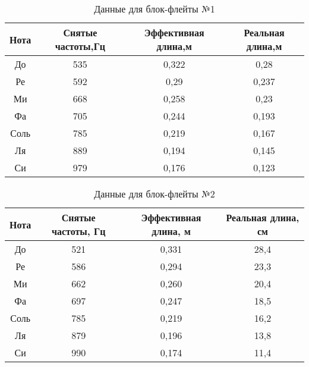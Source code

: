 \begin{table}[!ht]
    \centering
    \begin{tabular}{|c|c|c|c|}
    \hline
    Нота & Снятые частоты,Гц & Эффективная длина,м & Реальная длина,м    \\ \hline
    До   & 535                & 0,322                & 0,28              \\ \hline
    Ре   & 592                & 0,29                 & 0,237             \\ \hline
    Ми   & 668                & 0,258                & 0,23              \\ \hline
    Фа   & 705                & 0,244                & 0,193             \\ \hline
    Соль & 785                & 0,219                & 0,167             \\ \hline
    Ля   & 889                & 0,194                & 0,145             \\ \hline
    Си   & 979                & 0,176                & 0,123             \\ \hline
    \end{tabular}
    \caption{Данные для блок-флейты №1}
    \label{tab:dannie_dla_blok_fleita_1}
\end{table}

\begin{table}[!ht]
    \centering
    \begin{tabular}{|c|c|c|c|}
    \hline
    Нота & Снятые частоты, Гц & Эффективная длина, м & Реальная длина, см \\ \hline
    До   & 521                & 0,331                & 28,4               \\ \hline
    Ре   & 586                & 0,294                & 23,3               \\ \hline
    Ми   & 662                & 0,260                & 20,4               \\ \hline
    Фа   & 697                & 0,247                & 18,5               \\ \hline
    Соль & 785                & 0,219                & 16,2               \\ \hline
    Ля   & 879                & 0,196                & 13,8               \\ \hline
    Си   & 990                & 0,174                & 11,4               \\ \hline
    \end{tabular}
    \caption{Данные для блок-флейты №2}
    \label{tab:dannie_dla_blok_fleita_2}
\end{table}

